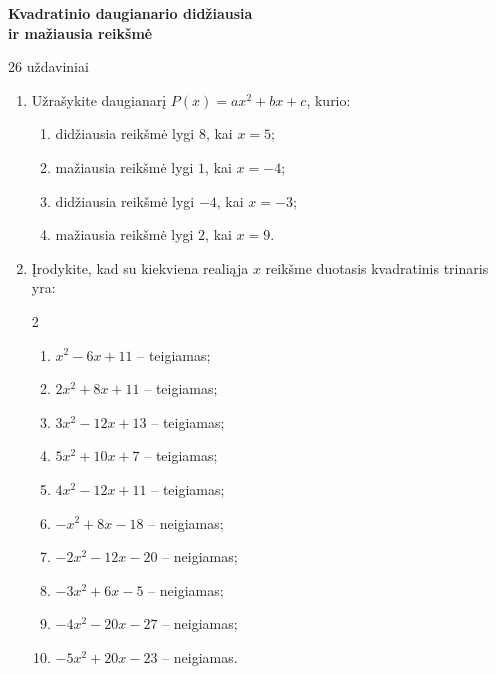 \documentclass[11pt,a4paper]{article}
\begin{document}
\begin{center}
{\Large\bfseries Kvadratinio daugianario didžiausia\\[2pt] ir mažiausia reikšmė}\par
\vspace{0.4em}
{\small 26 uždaviniai}
\end{center}
\begin{enumerate}




\item Užrašykite daugianarį $P(x)=ax^2+bx+c$, kurio:
\begin{enumerate}[label=(\alph*),leftmargin=1cm,itemsep=0.35em,topsep=0pt]
\item didžiausia reikšmė lygi $8$, kai $x=5$;
\item mažiausia reikšmė lygi $1$, kai $x=-4$;
\item didžiausia reikšmė lygi $-4$, kai $x=-3$;
\item mažiausia reikšmė lygi $2$, kai $x=9$.
\end{enumerate}
\item Įrodykite, kad su kiekviena realiąja $x$ reikšme duotasis kvadratinis trinaris yra:
\begin{multicols}{2}
\begin{enumerate}[label=(\alph*),leftmargin=1cm,itemsep=0.35em,topsep=0pt]
\item $x^2-6x+11$ -- teigiamas;
\item $2x^2+8x+11$ -- teigiamas;
\item $3x^2-12x+13$ -- teigiamas;
\item $5x^2+10x+7$ -- teigiamas;
\item $4x^2-12x+11$ -- teigiamas;
\item $-x^2+8x-18$ -- neigiamas;
\item $-2x^2-12x-20$ -- neigiamas;
\item $-3x^2+6x-5$ -- neigiamas;
\item $-4x^2-20x-27$ -- neigiamas;
\item $-5x^2+20x-23$ -- neigiamas.
\end{enumerate}
\end{multicols}
\end{enumerate}
\end{document}
